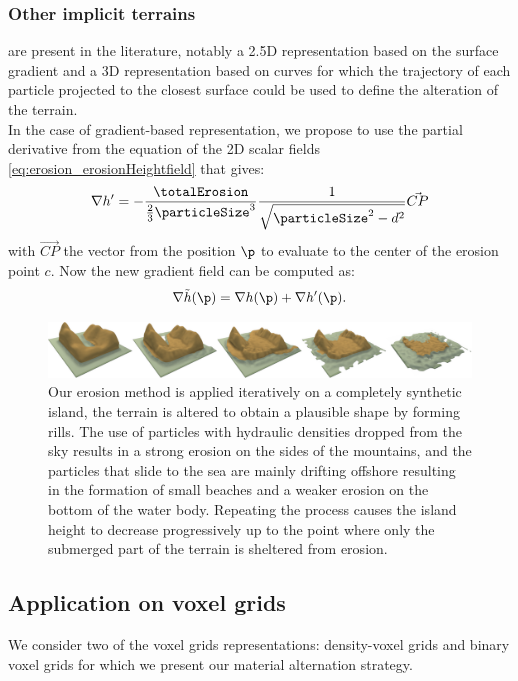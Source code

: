 \subsubsection{Other implicit terrains}
\label{sec:erosion_application_on_other_implicit}
are present in the literature, notably a 2.5D representation based on the surface gradient \cite{Guerin2022} and a 3D representation based on curves \cite{Becher2017} for which the trajectory of each particle projected to the closest surface could be used to define the alteration of the terrain.\\
In the case of gradient-based representation, we propose to use the partial derivative from the equation of the 2D scalar fields \eqref{eq:erosion_erosionHeightfield} that gives:
\begin{align} %
\nabla h' = - \frac{\totalErosion}{\frac{2}{3}\particleSize^3} \frac{1}{\sqrt{\particleSize^2 - d^2} } \vec{CP}
\end{align}
with $\vec{CP}$ the vector from the position $\p$ to evaluate to the center of the erosion point $c$.
Now the new gradient field can be computed as: 
$$
\nabla \Tilde{h}(\p) = \nabla h(\p) + \nabla h'(\p).
$$
\begin{figure}
\centering
\includegraphics{new_continuous_erosion2.png}
\caption{Our erosion method is applied iteratively on a completely synthetic island, the terrain is altered to obtain a plausible shape by forming rills. The use of particles with hydraulic densities dropped from the sky results in a strong erosion on the sides of the mountains, and the particles that slide to the sea are mainly drifting offshore resulting in the formation of small beaches and a weaker erosion on the bottom of the water body. Repeating the process causes the island height to decrease progressively up to the point where only the submerged part of the terrain is sheltered from erosion.}
\label{fig:erosion_continuous-erosion}

\end{figure}

\subsection{Application on voxel grids}
\label{sec:erosion_application_on_voxels}
We consider two of the voxel grids representations: density-voxel grids and binary voxel grids for which we present our material alternation strategy.

